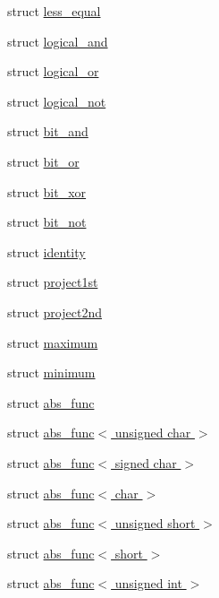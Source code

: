 \begin{DoxyCompactItemize}
\item 
struct \hyperlink{structcv_1_1gpu_1_1device_1_1less__equal}{less\-\_\-equal}
\item 
struct \hyperlink{structcv_1_1gpu_1_1device_1_1logical__and}{logical\-\_\-and}
\item 
struct \hyperlink{structcv_1_1gpu_1_1device_1_1logical__or}{logical\-\_\-or}
\item 
struct \hyperlink{structcv_1_1gpu_1_1device_1_1logical__not}{logical\-\_\-not}
\item 
struct \hyperlink{structcv_1_1gpu_1_1device_1_1bit__and}{bit\-\_\-and}
\item 
struct \hyperlink{structcv_1_1gpu_1_1device_1_1bit__or}{bit\-\_\-or}
\item 
struct \hyperlink{structcv_1_1gpu_1_1device_1_1bit__xor}{bit\-\_\-xor}
\item 
struct \hyperlink{structcv_1_1gpu_1_1device_1_1bit__not}{bit\-\_\-not}
\item 
struct \hyperlink{structcv_1_1gpu_1_1device_1_1identity}{identity}
\item 
struct \hyperlink{structcv_1_1gpu_1_1device_1_1project1st}{project1st}
\item 
struct \hyperlink{structcv_1_1gpu_1_1device_1_1project2nd}{project2nd}
\item 
struct \hyperlink{structcv_1_1gpu_1_1device_1_1maximum}{maximum}
\item 
struct \hyperlink{structcv_1_1gpu_1_1device_1_1minimum}{minimum}
\item 
struct \hyperlink{structcv_1_1gpu_1_1device_1_1abs__func}{abs\-\_\-func}
\item 
struct \hyperlink{structcv_1_1gpu_1_1device_1_1abs__func_3_01unsigned_01char_01_4}{abs\-\_\-func$<$ unsigned char $>$}
\item 
struct \hyperlink{structcv_1_1gpu_1_1device_1_1abs__func_3_01signed_01char_01_4}{abs\-\_\-func$<$ signed char $>$}
\item 
struct \hyperlink{structcv_1_1gpu_1_1device_1_1abs__func_3_01char_01_4}{abs\-\_\-func$<$ char $>$}
\item 
struct \hyperlink{structcv_1_1gpu_1_1device_1_1abs__func_3_01unsigned_01short_01_4}{abs\-\_\-func$<$ unsigned short $>$}
\item 
struct \hyperlink{structcv_1_1gpu_1_1device_1_1abs__func_3_01short_01_4}{abs\-\_\-func$<$ short $>$}
\item 
struct \hyperlink{structcv_1_1gpu_1_1device_1_1abs__func_3_01unsigned_01int_01_4}{abs\-\_\-func$<$ unsigned int $>$}

\end{DoxyCompactItemize}
